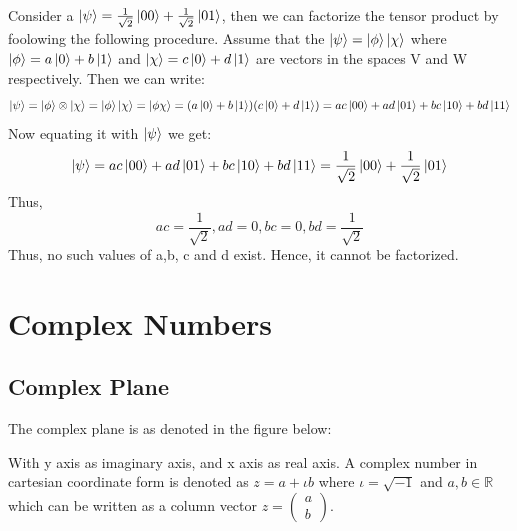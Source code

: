 Consider a $\ket{\psi}=\frac{1}{\sqrt{2}}\ket{00}+\frac{1}{\sqrt{2}}\ket{01}$, then we can factorize the tensor product by foolowing the following procedure.
Assume that the $\ket{\psi}=\ket{\phi}\ket{\chi}$ where $\ket{\phi}=a\ket{0}+b\ket{1}$ and $\ket{\chi}=c\ket{0}+d\ket{1}$ are vectors in the spaces V and W respectively. Then we can write:
\[ \ket{\psi}=\ket{\phi}\otimes \ket{\chi}=\ket{\phi}\ket{\chi}=\ket{\phi\chi}=(a\ket{0}+b\ket{1})(c\ket{0}+d\ket{1})=ac\ket{00}+ad\ket{01}+bc\ket{10}+bd\ket{11} \]
Now equating it with $\ket{\psi}$ we get:
\[ \ket{\psi}=ac\ket{00}+ad\ket{01}+bc\ket{10}+bd\ket{11}=\frac{1}{\sqrt{2}}\ket{00}+\frac{1}{\sqrt{2}}\ket{01} \]
Thus,
\[ ac=\frac{1}{\sqrt{2}}, ad=0, bc=0, bd=\frac{1}{\sqrt{2}} \]
Thus, no such values of a,b, c and d exist. Hence, it cannot be factorized.










\section{Complex Numbers}
\subsection{Complex Plane}
The complex plane is as denoted in the figure below:
\begin{center}
\end{center}
With y axis as imaginary axis, and x axis as real axis. A complex number in cartesian coordinate form is denoted as 
$z=a+\iota b$ where $\iota =\sqrt{-1}$ and $a,b \in \mathbb{R}$ which can be written as a column vector $z=\begin{pmatrix} a \\ b \end{pmatrix}$.

